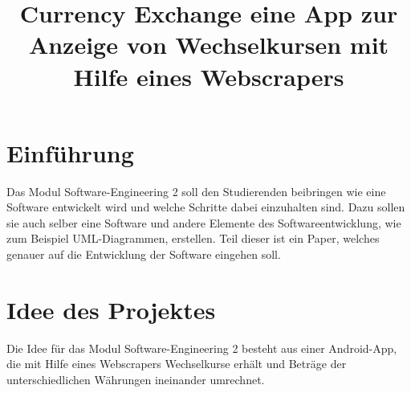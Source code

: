 \documentclass[conference]{IEEEtran}
\begin{document}
\title{Currency Exchange eine App zur Anzeige von Wechselkursen mit Hilfe eines Webscrapers}


\author{
\and
{}
\and
{}
}

\maketitle


\section{Einführung}
Das Modul Software-Engineering 2 soll den Studierenden beibringen wie eine Software entwickelt wird und welche Schritte dabei einzuhalten sind. Dazu sollen sie auch selber eine Software und andere Elemente des Softwareentwicklung, wie zum Beispiel UML-Diagrammen, erstellen. Teil dieser ist ein Paper, welches genauer auf die Entwicklung der Software eingehen soll.

\section{Idee des Projektes}
Die Idee für das Modul Software-Engineering 2 besteht aus einer Android-App, die mit Hilfe eines Webscrapers Wechselkurse erhält und Beträge der unterschiedlichen Währungen ineinander umrechnet.
\end{document}
